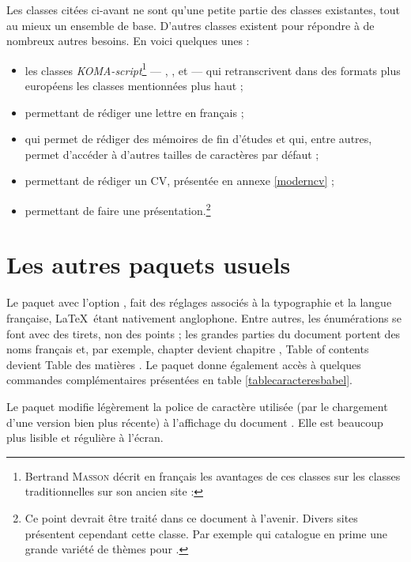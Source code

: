 Les classes citées ci-avant ne sont qu'une petite partie des classes existantes, tout au mieux un ensemble de base. D'autres classes existent pour répondre à de nombreux autres besoins. En voici quelques unes :
\begin{itemize}
\item les classes \emph{KOMA-script}\footnote{Bertrand \textsc{Masson} \cite{mass} décrit en français les avantages de ces classes sur les classes traditionnelles sur son ancien site : } --- , ,  et  --- qui retranscrivent dans des formats plus européens les classes mentionnées plus haut ;
\item {} permettant de rédiger une lettre en français ;
\item {} qui permet de rédiger des mémoires de fin d'études et qui, entre autres, permet d'accéder à d'autres tailles de caractères par défaut ;
\item {} permettant de rédiger un CV, présentée en annexe \ref{moderncv} ;
\item {} permettant de faire une présentation.\footnote{Ce point devrait être traité dans ce document à l'avenir. Divers sites présentent cependant cette classe. Par exemple  qui catalogue en prime une grande variété de thèmes pour .}
\end{itemize}

\section{Les autres paquets usuels}

Le paquet  avec l'option , fait des réglages associés à la typographie et la langue française, \LaTeX\ étant nativement anglophone. Entre autres, les énumérations se font avec des tirets, non des points ; les grandes parties du document portent des noms français et, par exemple, \og chapter \fg{} devient \og chapitre \fg{}, \og Table of contents \fg{} devient \og Table des matières \fg{}. Le paquet  donne également accès à quelques commandes complémentaires présentées en table \ref{tablecaracteresbabel}.

Le paquet  modifie légèrement la police de caractère utilisée (par le chargement d'une version bien plus récente) à l'affichage du document . Elle est beaucoup plus lisible et régulière à l'écran. 